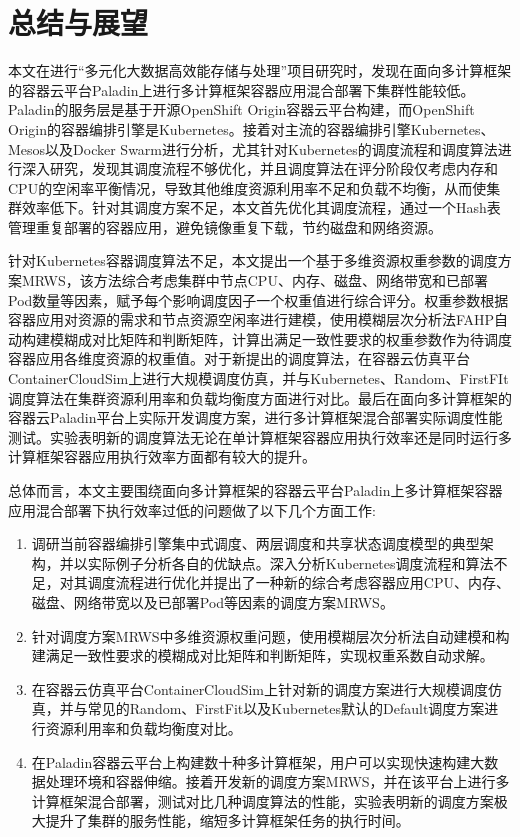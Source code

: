 \chapter{总结与展望}
本文在进行“多元化大数据高效能存储与处理”项目研究时，发现在面向多计算框架的容器云平台Paladin上进行多计算框架容器应用混合部署下集群性能较低。Paladin的服务层是基于开源OpenShift Origin容器云平台构建，而OpenShift Origin的容器编排引擎是Kubernetes。接着对主流的容器编排引擎Kubernetes、Mesos以及Docker Swarm进行分析，尤其针对Kubernetes的调度流程和调度算法进行深入研究，发现其调度流程不够优化，并且调度算法在评分阶段仅考虑内存和CPU的空闲率平衡情况，导致其他维度资源利用率不足和负载不均衡，从而使集群效率低下。针对其调度方案不足，本文首先优化其调度流程，通过一个Hash表管理重复部署的容器应用，避免镜像重复下载，节约磁盘和网络资源。

针对Kubernetes容器调度算法不足，本文提出一个基于多维资源权重参数的调度方案MRWS，该方法综合考虑集群中节点CPU、内存、磁盘、网络带宽和已部署Pod数量等因素，赋予每个影响调度因子一个权重值进行综合评分。权重参数根据容器应用对资源的需求和节点资源空闲率进行建模，使用模糊层次分析法FAHP自动构建模糊成对比矩阵和判断矩阵，计算出满足一致性要求的权重参数作为待调度容器应用各维度资源的权重值。对于新提出的调度算法，在容器云仿真平台ContainerCloudSim上进行大规模调度仿真，并与Kubernetes、Random、FirstFIt调度算法在集群资源利用率和负载均衡度方面进行对比。最后在面向多计算框架的容器云Paladin平台上实际开发调度方案，进行多计算框架混合部署实际调度性能测试。实验表明新的调度算法无论在单计算框架容器应用执行效率还是同时运行多计算框架容器应用执行效率方面都有较大的提升。

总体而言，本文主要围绕面向多计算框架的容器云平台Paladin上多计算框架容器应用混合部署下执行效率过低的问题做了以下几个方面工作:
\begin{enumerate}[(1)]
	\item 调研当前容器编排引擎集中式调度、两层调度和共享状态调度模型的典型架构，并以实际例子分析各自的优缺点。深入分析Kubernetes调度流程和算法不足，对其调度流程进行优化并提出了一种新的综合考虑容器应用CPU、内存、磁盘、网络带宽以及已部署Pod等因素的调度方案MRWS。
	\item 针对调度方案MRWS中多维资源权重问题，使用模糊层次分析法自动建模和构建满足一致性要求的模糊成对比矩阵和判断矩阵，实现权重系数自动求解。
	\item 在容器云仿真平台ContainerCloudSim上针对新的调度方案进行大规模调度仿真，并与常见的Random、FirstFit以及Kubernetes默认的Default调度方案进行资源利用率和负载均衡度对比。
	\item 在Paladin容器云平台上构建数十种多计算框架，用户可以实现快速构建大数据处理环境和容器伸缩。接着开发新的调度方案MRWS，并在该平台上进行多计算框架混合部署，测试对比几种调度算法的性能，实验表明新的调度方案极大提升了集群的服务性能，缩短多计算框架任务的执行时间。
\end{enumerate}

